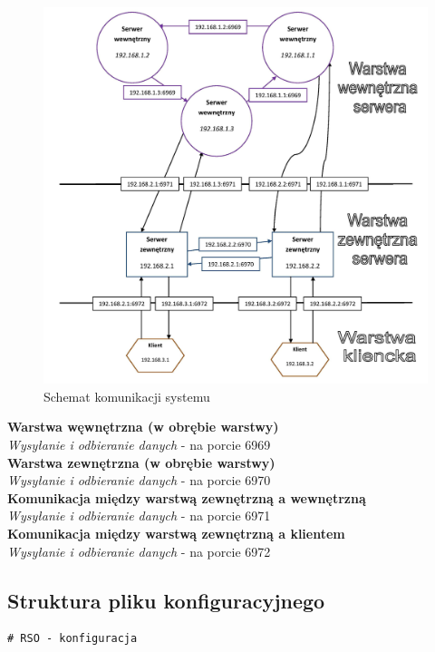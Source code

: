 {\begin{figure}[h!tb]
\begin{center}
\includegraphics[width=0.9\linewidth]{img/komunikacja_schemat.jpg} 
\caption{Schemat komunikacji systemu}
\label{img:schem_kom}
\end{center}
\end{figure}

\textbf{Warstwa węwnętrzna (w obrębie warstwy)} \\
\textit{Wysyłanie i odbieranie danych} - na porcie 6969 \\

\textbf{Warstwa zewnętrzna (w obrębie warstwy)} \\
\textit{Wysyłanie i odbieranie danych} - na porcie 6970 \\


\textbf{Komunikacja między warstwą zewnętrzną a wewnętrzną} \\
\textit{Wysyłanie i odbieranie danych} - na porcie 6971 \\


\textbf{Komunikacja między warstwą zewnętrzną a klientem} \\
\textit{Wysyłanie i odbieranie danych} - na porcie 6972 \\




\subsection[Struktura pliku konfiguracyjnego]{Struktura pliku konfiguracyjnego}
\begin{lstlisting}
# RSO - konfiguracja


\end{lstlisting}}
